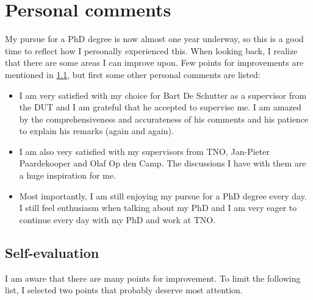 \section{Personal comments}
\label{sec:personal}

My pursue for a PhD degree is now almost one year underway, so this is a good time to reflect how I personally experienced this. When looking back, I realize that there are some areas I can improve upon. Few points for improvements are mentioned in \cref{sec:evaluation}, but first some other personal comments are listed:
\begin{itemize}
	\item I am very satisfied with my choice for Bart De Schutter as a supervisor from the DUT and I am grateful that he accepted to supervise me. I am amazed by the comprehensiveness and accurateness of his comments and his patience to explain his remarks (again and again).
	\item I am also very satisfied with my supervisors from TNO, Jan-Pieter Paardekooper and Olaf Op den Camp. The discussions I have with them are a huge inspiration for me.
	\item Most importantly, I am still enjoying my pursue for a PhD degree every day. I still feel enthusiasm when talking about my PhD and I am very eager to continue every day with my PhD and work at TNO. 
\end{itemize}

\subsection{Self-evaluation}
\label{sec:evaluation}

I am aware that there are many points for improvement. To limit the following list, I selected two points that probably deserve most attention.

